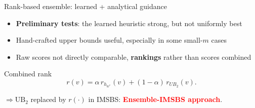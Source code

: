 \documentclass{beamer}
\begin{document}
\begin{frame}{Rank-based ensemble: learned + analytical guidance}
\begin{itemize}
  \item \textbf{Preliminary tests}: the learned heuristic strong, but not uniformly best
  \item Hand-crafted upper bounds useful, especially in some small-$m$ cases \vspace{0.3cm}
  \item Raw scores not directly comparable, \textbf{rankings} rather than scores combined
\end{itemize}
\vspace{0.25cm}
\begin{block}{Combined rank}
\[
 r(v)=\alpha\,r_{h_{w^*}}(v)+(1-\alpha)\,r_{UB_2}(v).
\]
\end{block}
\vspace{0.15cm}
$\Rightarrow \textrm{UB}_2$ replaced by $r(\cdot)$ in IMSBS:  \textcolor{red}{\textbf{Ensemble-IMSBS approach}}.
\end{frame}
\end{document}
